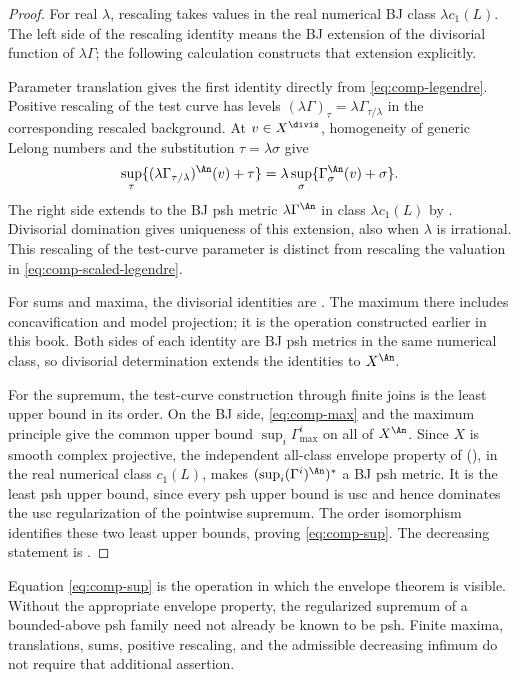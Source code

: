 \begin{proof}
For real $\lambda$, rescaling takes values in the real numerical
BJ class $\lambda c_1(L)$. The left side of the rescaling identity
means the BJ extension of the divisorial function of $\lambda\Gamma$;
the following calculation constructs that extension explicitly.

Parameter translation gives the first identity directly from
\eqref{eq:comp-legendre}. Positive rescaling of the test curve has
levels $(\lambda\Gamma)_\tau=\lambda\Gamma_{\tau/\lambda}$ in
the corresponding rescaled background. At $v\in X^{\divis}$,
homogeneity of generic Lelong numbers and the substitution
$\tau=\lambda\sigma$ give
\[
 \sup_\tau\{(\lambda\Gamma_{\tau/\lambda})^{\An}(v)+\tau\}
   =\lambda\sup_\sigma\{\Gamma_\sigma^{\An}(v)+\sigma\}.
\]
The right side extends to the BJ psh metric $\lambda\Gamma^{\An}$
in class $\lambda c_1(L)$ by \cite[Theorem~4.7]{BJ22}.
Divisorial domination gives uniqueness of this extension, also
when $\lambda$ is irrational. This rescaling of the test-curve
parameter is distinct from rescaling the valuation in
\eqref{eq:comp-scaled-legendre}.

For sums and maxima, the divisorial identities are
\cite[Lemma~4.17 and Corollary~4.8]{XiaOperationsV3}.
The maximum there includes concavification and model projection;
it is the operation constructed earlier in this book.
Both sides of each identity are BJ psh metrics in the same
numerical class, so divisorial determination extends the identities
to $X^{\An}$.

For the supremum, the test-curve construction through finite joins
is the least upper bound in its order. On the BJ side,
\eqref{eq:comp-max} and the maximum principle give the common
upper bound $\sup_i\Gamma^i_{\max}$ on all of $X^{\An}$.
Since $X$ is smooth complex projective, the independent all-class envelope
property of 
(\cite[Theorem~A]{BJ22b}), in the real numerical class $c_1(L)$,
makes $(\sup_i(\Gamma^i)^{\An})^*$ a BJ psh metric. It is the least
psh upper bound, since every psh upper bound is usc and hence
dominates the usc regularization of the pointwise supremum.
The order isomorphism  identifies these two
least upper bounds, proving \eqref{eq:comp-sup}.
The decreasing statement is .
\end{proof}

\begin{remark}
\label{rem:comp-operation-envelope-firewall}
Equation \eqref{eq:comp-sup} is the operation in which the envelope theorem
is visible.
Without the appropriate envelope property, the regularized supremum of a
bounded-above psh family need not already be known to be psh.
Finite maxima, translations, sums, positive rescaling, and the admissible
decreasing infimum do not require that additional assertion.
\end{remark}

